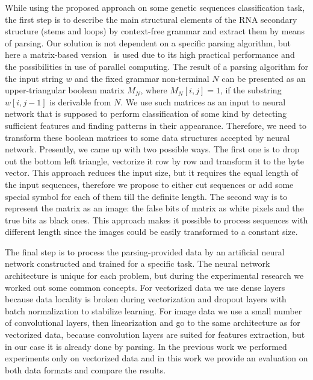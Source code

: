 \documentclass[12pt,a4paper]{cibb}
\begin{document}
While using the proposed approach on some genetic sequences classification task, the first step is to describe the main structural elements of the RNA secondary structure (stems and loops) by context-free grammar and extract them by means of parsing. Our solution is not dependent on a specific parsing algorithm, but here a matrix-based version~\cite{Azimov:2018:CPQ:3210259.3210264} is used due to its high practical performance and the possibilities in use of parallel computing. The result of a parsing algorithm for the input string $w$ and the fixed grammar non-terminal $N$ can be presented as an upper-triangular boolean matrix $M_N$, where $M_N [i,j] = 1$, if the substring $w[i,j-1]$ is derivable from $N$. We use such matrices as an input to neural network that is supposed to perform classification of some kind by detecting sufficient features and finding patterns in their appearance. Therefore, we need to transform these boolean matrices to some data structures accepted by neural network. Presently, we came up with two possible ways. The first one is to drop out the bottom left triangle, vectorize it row by row and transform it to the byte vector. This approach reduces the input size, but it requires the equal length of the input sequences, therefore we propose to either cut sequences or add some special symbol for each of them till the definite length. The second way is to represent the matrix as an image: the false bits of matrix as white pixels and the true bits as black ones. This approach makes it possible to process sequences with different length since the images could be easily transformed to a constant size. 

The final step is to process the parsing-provided data by an artificial neural network constructed and trained for a specific task. The neural network architecture is unique for each problem, but during the experimental research we worked out some common concepts. For vectorized data we use dense layers because data locality is broken during vectorization and dropout layers with batch normalization to stabilize learning. For image data we use a small number of convolutional layers, then linearization and go to the same architecture as for vectorized data, because convolution layers are suited for features extraction, but in our case it is already done by parsing. In the previous work we performed experiments only on vectorized data and in this work we provide an evaluation on both data formats and compare the results.
\end{document}
